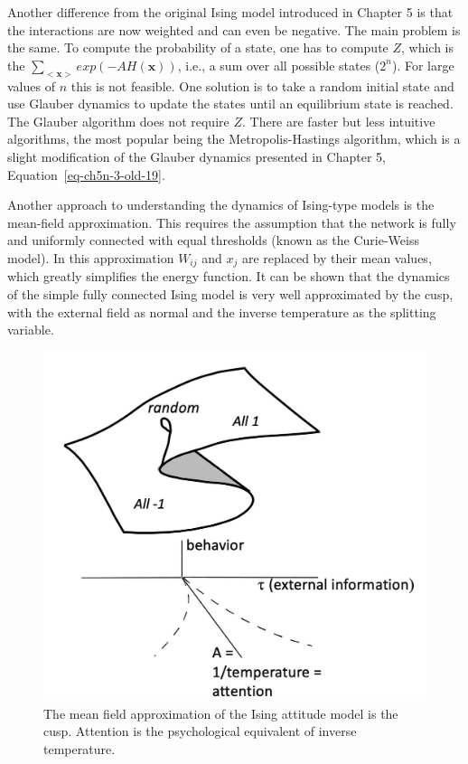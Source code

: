 \documentclass[
  a4paper,
  DIV=11,
  numbers=noendperiod,
  oneside]{scrreprt}
\begin{document}
Another difference from the original Ising model introduced in Chapter 5
is that the interactions are now weighted and can even be negative. The
main problem is the same. To compute the probability of a state, one has
to compute \(Z\), which is the
\(\sum_{< \mathbf{x} >}^{}{exp( - AH\left( \mathbf{x} \right))}\), i.e.,
a sum over all possible states (\(2^{n}\)). For large values of \(n\)
this is not feasible. One solution is to take a random initial state and
use Glauber dynamics to update the states until an equilibrium state is
reached. The Glauber algorithm does not require \(Z\). There are faster
but less intuitive algorithms, the most popular being the
Metropolis-Hastings algorithm, which is a slight modification of the
Glauber dynamics presented in Chapter 5,
Equation~\ref{eq-ch5n-3-old-19}.

Another approach to understanding the dynamics of Ising-type models is
the mean-field approximation. This requires the assumption that the
network is fully and uniformly connected with equal thresholds (known as
the Curie-Weiss model). In this approximation \(W_{ij}\) and \(x_{j}\)
are replaced by their mean values, which greatly simplifies the energy
function. It can be shown that the dynamics of the simple fully
connected Ising model is very well approximated by the cusp, with the
external field as normal and the inverse temperature as the splitting
variable.

\begin{figure}

{\centering \includegraphics{media/ch6/image11.jpg}

}

\caption{\label{fig-ch6-img11-old-80}The mean field approximation of the
Ising attitude model is the cusp. Attention is the psychological
equivalent of inverse temperature.}

\end{figure}
\end{document}

